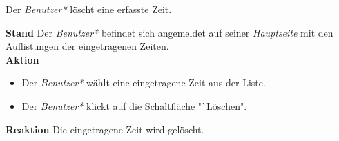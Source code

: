 \begin{requirements}
     Der \emph{Benutzer*} löscht eine erfasste Zeit.
    \begin{requirements}
            \textbf{Stand} Der \emph{Benutzer*} befindet sich angemeldet auf seiner \emph{Hauptseite} mit den Auflistungen der eingetragenen Zeiten. \\
            \textbf{Aktion}
                \begin{itemize}
                    \item Der \emph{Benutzer*} wählt eine eingetragene Zeit aus der Liste.
                    \item Der \emph{Benutzer*} klickt auf die Schaltfläche "`Löschen".
                \end{itemize}
            \textbf{Reaktion} Die eingetragene Zeit wird gelöscht.
    \end{requirements}
            
    
\end{requirements}
